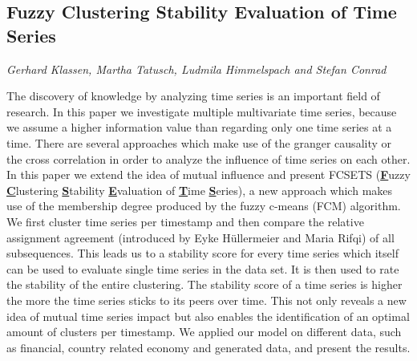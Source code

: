 \documentclass[../booklet.tex]{subfiles}
\begin{document}
\subsection[Fuzzy Clustering Stability Evaluation of Time Series. {\it Gerhard Klassen, Martha Tatusch, Ludmila Himmelspach and Stefan Conrad}]{Fuzzy Clustering Stability Evaluation of Time Series}
   

\begin{center}
  {\it Gerhard Klassen, Martha Tatusch, Ludmila Himmelspach and Stefan Conrad}
\end{center}

\vskip 0.8cm


The discovery of knowledge by analyzing time series is an important field of research. In this paper we investigate multiple multivariate time series, because we assume a higher information value than regarding only one time series at a time. There are several approaches which make use of the granger causality or the cross correlation in order to analyze the influence of time series on each other. In this paper we extend the idea of mutual influence and present FCSETS (\textbf{\underline{F}}uzzy \textbf{\underline{C}}lustering \textbf{\underline{S}}tability \textbf{\underline{E}}valuation of \textbf{\underline{T}}ime \textbf{\underline{S}}eries), a new approach which makes use of the membership degree produced by the fuzzy c-means (FCM) algorithm. We first cluster time series per timestamp and then compare the relative assignment agreement (introduced by Eyke H{\"u}ller\-meier and Maria Rifqi) of all subsequences. This leads us to a stability score for every time series which itself can be used to evaluate single time series in the data set. It is then used to rate the stability of the entire clustering. The stability score of a time series is higher the more the time series sticks to its peers over time. This not only reveals a new idea of mutual time series impact but also enables the identification of an optimal amount of clusters per timestamp.
We applied our model on different data, such as financial, country related economy and generated data, and present the results.

\end{document}
